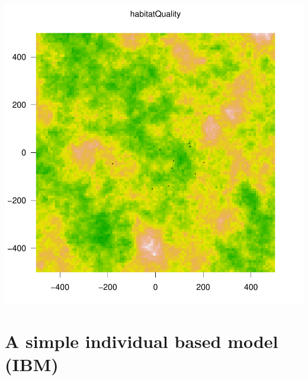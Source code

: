 \documentclass{article}
\begin{document}
\includegraphics{introduction-mobile-point-agent}

\newpage

\section{A simple individual based model (IBM)}

\lipsum
\end{document}
